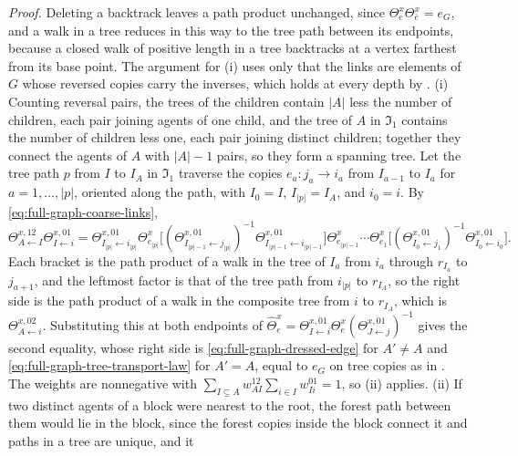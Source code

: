 \noindent\emph{Proof.}
Deleting a backtrack leaves a path product unchanged, since $\Theta^x_e\Theta^x_{\bar e}=e_G$, and a walk in
a tree reduces in this way to the tree path between its endpoints, because a closed walk of positive length
in a tree backtracks at a vertex farthest from its base point. The argument for (i) uses only that the links
are elements of $G$ whose reversed copies carry the inverses, which holds at every depth by
. (i) Counting reversal pairs, the trees of the children contain
$\lvert A\rvert$ less the number of children, each pair joining agents of one child, and the tree of $A$ in
$\mathfrak I_1$ contains the number of children less one, each pair joining distinct children; together
they connect the agents of $A$ with $\lvert A\rvert-1$ pairs, so they form a spanning tree. Let the tree path
$p$ from $I$ to $I_A$ in $\mathfrak I_1$ traverse the copies $e_a:j_a\to i_a$ from $I_{a-1}$ to $I_a$ for
$a=1,\ldots,\lvert p\rvert$, oriented along the path, with $I_0=I$, $I_{\lvert p\rvert}=I_A$, and $i_0=i$.
By \eqref{eq:full-graph-coarse-links},
\[
\Theta^{x,12}_{A\leftarrow I}\Theta^{x,01}_{I\leftarrow i}
=\Theta^{x,01}_{I_{\lvert p\rvert}\leftarrow i_{\lvert p\rvert}}\Theta^x_{e_{\lvert p\rvert}}
\bigl[(\Theta^{x,01}_{I_{\lvert p\rvert-1}\leftarrow j_{\lvert p\rvert}})^{-1}
\Theta^{x,01}_{I_{\lvert p\rvert-1}\leftarrow i_{\lvert p\rvert-1}}\bigr]
\Theta^x_{e_{\lvert p\rvert-1}}\cdots\Theta^x_{e_1}
\bigl[(\Theta^{x,01}_{I_0\leftarrow j_1})^{-1}\Theta^{x,01}_{I_0\leftarrow i_0}\bigr].
\]
Each bracket is the path product of a walk in the tree of $I_a$ from $i_a$ through $r_{I_a}$ to $j_{a+1}$, and
the leftmost factor is that of the tree path from $i_{\lvert p\rvert}$ to $r_{I_A}$, so the right side is the
path product of a walk in the composite tree from $i$ to $r_{I_A}$, which is $\Theta^{x,02}_{A\leftarrow i}$.
Substituting this at both endpoints of
$\widehat\Theta^x_e=\Theta^{x,01}_{I\leftarrow i}\Theta^x_e(\Theta^{x,01}_{J\leftarrow j})^{-1}$ gives the
second equality, whose right side is \eqref{eq:full-graph-dressed-edge} for $A'\neq A$ and
\eqref{eq:full-graph-tree-transport-law} for $A'=A$, equal to $e_G$ on tree copies as in
. The weights are nonnegative with
$\sum_{I\subseteq A}w^{12}_{AI}\sum_{i\in I}w^{01}_{Ii}=1$, so (ii)
applies. (ii) If two distinct agents of a block were nearest to the root, the forest path between them would
lie in the block, since the forest copies inside the block connect it and paths in a tree are unique, and it
